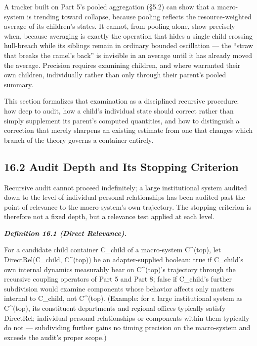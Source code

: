 \documentclass[
]{article}
\begin{document}
A tracker built on Part 5's pooled aggregation (§5.2) can show that a
macro-system is trending toward collapse, because pooling reflects the
resource-weighted average of its children's states. It cannot, from
pooling alone, show precisely when, because averaging is exactly the
operation that hides a single child crossing hull-breach while its
siblings remain in ordinary bounded oscillation --- the ``straw that
breaks the camel's back'' is invisible in an average until it has
already moved the average. Precision requires examining children, and
where warranted their own children, individually rather than only
through their parent's pooled summary.

This section formalizes that examination as a disciplined recursive
procedure: how deep to audit, how a child's individual state should
correct rather than simply supplement its parent's computed quantities,
and how to distinguish a correction that merely sharpens an existing
estimate from one that changes which branch of the theory governs a
container entirely.

\hypertarget{audit-depth-and-its-stopping-criterion}{%
\subsection{16.2 Audit Depth and Its Stopping
Criterion}\label{audit-depth-and-its-stopping-criterion}}

Recursive audit cannot proceed indefinitely; a large institutional
system audited down to the level of individual personal relationships
has been audited past the point of relevance to the macro-system's own
trajectory. The stopping criterion is therefore not a fixed depth, but a
relevance test applied at each level.

\emph{\textbf{Definition 16.1 (Direct Relevance).}}

For a candidate child container C\_child of a macro-system C\^{}(top),
let DirectRel(C\_child, C\^{}(top)) be an adapter-supplied boolean: true
if C\_child's own internal dynamics measurably bear on C\^{}(top)'s
trajectory through the recursive coupling operators of Part 5 and Part
8; false if C\_child's further subdivision would examine components
whose behavior affects only matters internal to C\_child, not
C\^{}(top). (Example: for a large institutional system as C\^{}(top),
its constituent departments and regional offices typically satisfy
DirectRel; individual personal relationships or components within them
typically do not --- subdividing further gains no timing precision on
the macro-system and exceeds the audit's proper scope.)
\end{document}

